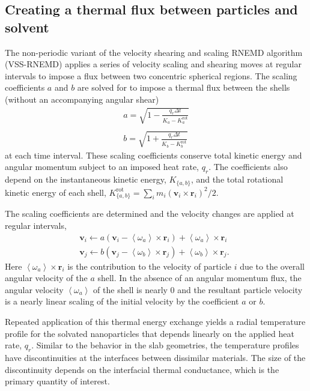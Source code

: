 \subsection{Creating a thermal flux between particles and solvent}

The non-periodic variant of the velocity shearing and scaling RNEMD
algorithm (VSS-RNEMD)\cite{Stocker:2014qq} applies a series of
velocity scaling and shearing moves at regular intervals to impose a
flux between two concentric spherical regions. The scaling coefficients 
$a$ and $b$ are solved for to impose a thermal
flux between the shells (without an accompanying angular shear)
\begin{eqnarray}
	a = \sqrt{1 - \frac{q_r \Delta t}{K_a - K_a^\mathrm{rot}}}\\ \nonumber\\
	b = \sqrt{1 + \frac{q_r \Delta t}{K_b - K_b^\mathrm{rot}}}
\end{eqnarray}
at each time interval.  These scaling coefficients conserve total
kinetic energy and angular momentum subject to an imposed heat rate,
$q_r$.  The coefficients also depend on the instantaneous kinetic
energy, $K_{\{a,b\}}$, and the total rotational kinetic energy of each
shell, $K_{\{a,b\}}^\mathrm{rot} = \sum_i m_i \left( \mathbf{v}_i
  \times \mathbf{r}_i \right)^2 / 2$.

The scaling coefficients are determined and the velocity changes are
applied at regular intervals, 
\begin{eqnarray}
	\mathbf{v}_i \leftarrow a \left ( \mathbf{v}_i - \left < \omega_a \right > \times \mathbf{r}_i \right ) + \left < \omega_a \right > \times \mathbf{r}_i~~\:\\
	\mathbf{v}_j \leftarrow b \left ( \mathbf{v}_j - \left < \omega_b \right > \times \mathbf{r}_j \right ) + \left < \omega_b \right > \times \mathbf{r}_j.
\end{eqnarray}
Here $\left < \omega_a \right > \times \mathbf{r}_i$ is the
contribution to the velocity of particle $i$ due to the overall
angular velocity of the $a$ shell. In the absence of an angular
momentum flux, the angular velocity $\left < \omega_a \right >$ of the
shell is nearly 0 and the resultant particle velocity is a nearly
linear scaling of the initial velocity by the coefficient $a$ or $b$.

Repeated application of this thermal energy exchange yields a radial
temperature profile for the solvated nanoparticles that depends
linearly on the applied heat rate, $q_r$. Similar to the behavior in
the slab geometries, the temperature profiles have discontinuities at
the interfaces between dissimilar materials.  The size of the
discontinuity depends on the interfacial thermal conductance, which is
the primary quantity of interest.


